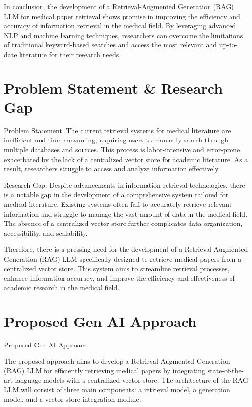 \documentclass{article}
\begin{document}
In conclusion, the development of a Retrieval-Augmented Generation (RAG) LLM for medical paper retrieval shows promise in improving the efficiency and accuracy of information retrieval in the medical field. By leveraging advanced NLP and machine learning techniques, researchers can overcome the limitations of traditional keyword-based searches and access the most relevant and up-to-date literature for their research needs.

\section*{Problem Statement \& Research Gap}
Problem Statement:
The current retrieval systems for medical literature are inefficient and time-consuming, requiring users to manually search through multiple databases and sources. This process is labor-intensive and error-prone, exacerbated by the lack of a centralized vector store for academic literature. As a result, researchers struggle to access and analyze information effectively.

Research Gap:
Despite advancements in information retrieval technologies, there is a notable gap in the development of a comprehensive system tailored for medical literature. Existing systems often fail to accurately retrieve relevant information and struggle to manage the vast amount of data in the medical field. The absence of a centralized vector store further complicates data organization, accessibility, and scalability.

Therefore, there is a pressing need for the development of a Retrieval-Augmented Generation (RAG) LLM specifically designed to retrieve medical papers from a centralized vector store. This system aims to streamline retrieval processes, enhance information accuracy, and improve the efficiency and effectiveness of academic research in the medical field.

\section*{Proposed Gen AI Approach}
Proposed Gen AI Approach:

The proposed approach aims to develop a Retrieval-Augmented Generation (RAG) LLM for efficiently retrieving medical papers by integrating state-of-the-art language models with a centralized vector store. The architecture of the RAG LLM will consist of three main components: a retrieval model, a generation model, and a vector store integration module.
\end{document}
